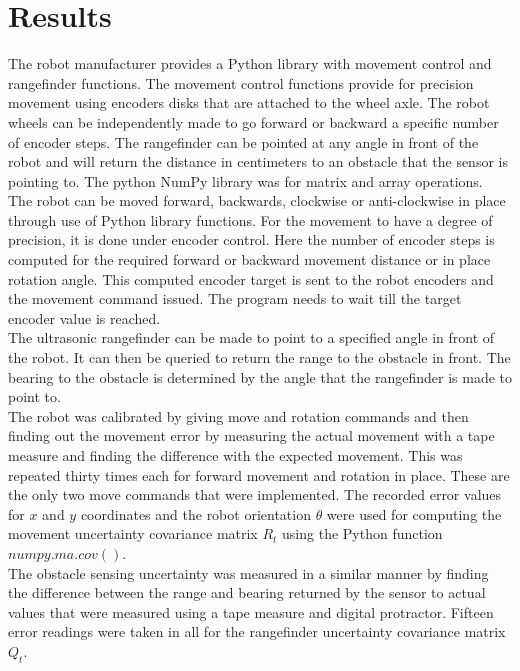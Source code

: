 \documentclass[conference]{IEEEtran}
\begin{document}
\section{Results}

The robot manufacturer provides a Python library with movement control and rangefinder functions. The movement control functions provide for precision movement using encoders disks that are attached to the wheel axle. The robot wheels can be independently made to go forward or backward a specific number of encoder steps. The rangefinder can be pointed at any angle in front of the robot and will return the distance in centimeters to an obstacle that the sensor is pointing to. The python NumPy library was for matrix and array operations.\\

The robot can be moved forward, backwards, clockwise or anti-clockwise in place through use of Python library functions. For the movement to have a degree of precision, it is done under encoder control. Here the number of encoder steps is computed for the required forward or backward movement distance or in place rotation angle. This computed encoder target is sent to the robot encoders and the movement command issued. The program needs to wait till the target encoder value is reached.\\

The ultrasonic rangefinder can be made to point to a specified angle in front of the robot. It can then be queried to return the range to the obstacle in front. The bearing to the obstacle is determined by the angle that the rangefinder is made to point to.\\

The robot was calibrated by giving move and rotation commands and then finding out the movement error by measuring the actual movement with a tape measure and finding the difference with the expected movement. This was repeated thirty times each for forward movement and rotation in place. These are the only two move commands that were implemented. The recorded error values for $x$ and $y$ coordinates and the robot orientation $\theta$ were used for computing the movement uncertainty covariance matrix $R_t$ using the Python function $numpy.ma.cov()$.\\

The obstacle sensing uncertainty was measured in a similar manner by finding the difference between the range and bearing returned by the sensor to actual values that were measured using a tape measure and digital protractor. Fifteen error readings were taken in all for the rangefinder uncertainty covariance matrix $Q_t$.\\
\end{document}
